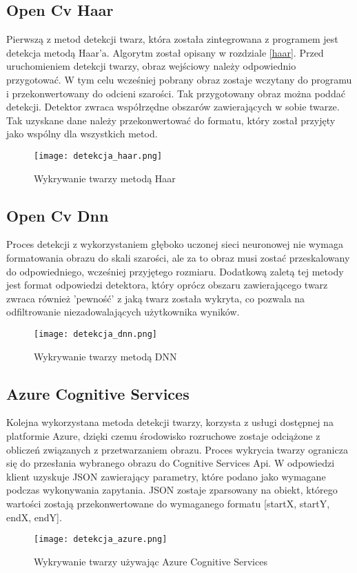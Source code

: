 \subsection{Open Cv Haar} \label{detekcja_haar}
Pierwszą z metod detekcji twarz, która została zintegrowana z programem jest detekcja metodą Haar'a. Algorytm został opisany w rozdziale \ref{haar}. Przed uruchomieniem detekcji twarzy, obraz wejściowy należy odpowiednio przygotować. W tym celu wcześniej pobrany obraz zostaje wczytany do programu i przekonwertowany do odcieni szarości. Tak przygotowany obraz można poddać detekcji. Detektor zwraca współrzędne obszarów zawierających w sobie twarze. Tak uzyskane dane należy przekonwertować do formatu, który został przyjęty jako wspólny dla wszystkich metod.
\begin{figure}[H]
	\centering
	\texttt{[image: detekcja\_haar.png]}
	\caption{Wykrywanie twarzy metodą Haar}
	\label{fig:wykrywanie_haar}
\end{figure}

\subsection{Open Cv Dnn} \label{detekcja_dnn}
Proces detekcji z wykorzystaniem głęboko uczonej sieci neuronowej nie wymaga formatowania obrazu do skali szarości, ale za to obraz musi zostać przeskalowany do odpowiedniego, wcześniej przyjętego rozmiaru. Dodatkową zaletą tej metody jest format odpowiedzi detektora, który oprócz obszaru zawierającego twarz zwraca również 'pewność' z jaką twarz została wykryta, co pozwala na odfiltrowanie niezadowalających użytkownika wyników.
\begin{figure}[H]
	\centering
	\texttt{[image: detekcja\_dnn.png]}
	\caption{Wykrywanie twarzy metodą DNN}
	\label{fig:wykrywanie_dnn}
\end{figure}

\subsection{Azure Cognitive Services} \label{detekcja_azure}
Kolejna wykorzystana metoda detekcji twarzy, korzysta z usługi dostępnej na platformie Azure, dzięki czemu środowisko rozruchowe zostaje odciążone z obliczeń związanych z przetwarzaniem obrazu. Proces wykrycia twarzy ogranicza się do przesłania wybranego obrazu do Cognitive Services Api. W odpowiedzi klient uzyskuje JSON zawierający parametry, które podano jako wymagane podczas wykonywania zapytania. JSON zostaje zparsowany na obiekt, którego wartości zostają przekonwertowane do wymaganego formatu [startX, startY, endX, endY].
\begin{figure}[H]
	\centering
	\texttt{[image: detekcja\_azure.png]}
	\caption{Wykrywanie twarzy używając Azure Cognitive Services}
	\label{fig:wykrywanie_azure}
\end{figure}


